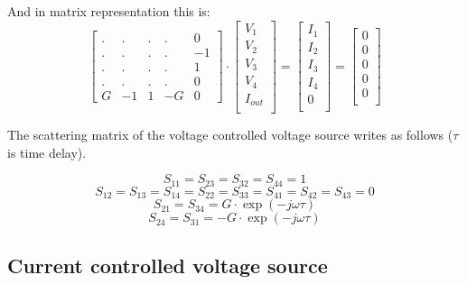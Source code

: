 And in matrix representation this is:
\begin{equation}
\begin{bmatrix}
.&.&.&.& 0\\
.&.&.&.& -1\\
.&.&.&.& 1\\
.&.&.&.& 0\\
G & -1 & 1 & -G & 0
\end{bmatrix}
\cdot
\begin{bmatrix}
V_{1}\\
V_{2}\\
V_{3}\\
V_{4}\\
I_{out}\\
\end{bmatrix}
=
\begin{bmatrix}
I_{1}\\
I_{2}\\
I_{3}\\
I_{4}\\
0\\
\end{bmatrix}
=
\begin{bmatrix}
0\\
0\\
0\\
0\\
0\\
\end{bmatrix}
\end{equation}

The scattering matrix of the voltage controlled voltage source
writes as follows ($\tau$ is time delay).

\begin{equation}
S_{11} = S_{23} = S_{32} = S_{44} = 1
\end{equation}
\begin{equation}
S_{12} = S_{13} = S_{14} = S_{22} = S_{33} = S_{41} = S_{42} = S_{43} = 0
\end{equation}
\begin{equation}
S_{21} = S_{34} = G\cdot \exp\left(-j\omega\tau\right)
\end{equation}
\begin{equation}
S_{24} = S_{31} = -G\cdot \exp\left(-j\omega\tau\right)
\end{equation}


\subsection{Current controlled voltage source}
\label{sec:ccvs}

